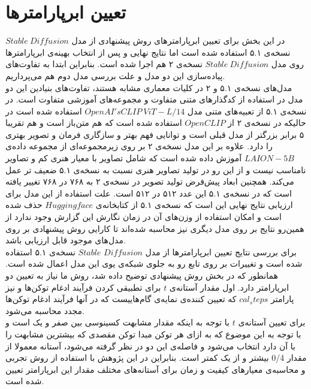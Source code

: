\section{تعیین ابرپارامترها}
در این بخش برای تعیین ابرپارامتر‌های روش پیشنهادی از مدل $Stable\ Diffusion$ نسخه‌ی ۵.۱ استفاده شده است اما نتایج نهایی و پس از انتخاب بهینه‌ی ابرپارامترها روی مدل $Stable\ Diffusion$ نسخه‌ی ۲ هم اجرا شده است. بنابراین ابتدا به تفاوت‌های پیاده‌سازی این دو مدل و علت بررسی مدل دوم هم می‌پرداریم.
\\
مدل‌های نسخه‌ی ۵.۱ و ۲ در کلیات معماری مشابه هستند، تفاوت‌های بنیادین این دو مدل در استفاده از کدگذارهای متنی متفاوت و مجموعه‌های آموزشی متفاوت است. در نسخه‌ی ۵.۱ از تعبیه‌های متنی مدل $OpenAI's CLIP\ ViT-L/14$ \cite{radford2021learning} استفاده شده است در حالیکه در نسخه‌ی ۲ از $OpenCLIP$ \cite{cherti2023reproducible}  استفاده شده است که هم متن‌باز است و هم تقریبا ۵ برابر بزرگتر از مدل قبلی است و توانایی فهم بهتر و سازگاری فرمان و تصویر بهتری را دارد. علاوه‌ بر این مدل نسخه‌ی ۲ بر روی زیرمجموعه‌ای از مجموعه داده‌ی $LAION-5B $ آموزش داده شده است که شامل تصاویر با معیار هنری کم و تصاویر نامناسب نیست و از این رو در تولید تصاویر هنری نسبت به نسخه‌ی ۵.۱ ضعیف تر عمل می‌کند. همچنین ابعاد پیش‌فرض تولید تصویر در نسخه‌ی ۲ به ۷۶۸ در ۷۶۸ تغییر یافته است که در نسخه‌ی ۵.۱ این عدد ۵۱۲ در ۵۱۲ است. علت استفاده از این مدل برای ارزیابی نتایج نهایی این است که نسخه‌ی ۵.۱ از کتابخانه‌ی $Hugging face$ حذف شده است و امکان استفاده از وزن‌های آن در زمان نگارش این گزارش وجود ندارد از همین‌رو نتایج بر روی مدل دیگری نیز محاسبه شده‌اند تا کارایی روش پیشنهادی بر روی مدل‌های موجود قابل ارزیابی باشد.
\\
برای بررسی نتایج تعیین ابرپارامتر‌ها از مدل $Diffusion$ $Stable$ نسخه‌ی ۵.۱ استفاده شده است و تغییرات بر روی تابع رو به جلوی شبکه‌ی یوی این مدل اعمال شده است. همانطور که در بخش روش پیشنهادی توضیح داده شد، روش ما نیاز به تعیین دو ابرپارامتر دارد. اول مقدار آستانه‌ی $t$  برای تطبیقی کردن فرآیند ادغام توکن‌ها و نیز پارامتر $cal_steps$ که تعیین کننده‌ی نمایه‌ی گام‌هاییست که در آنها فرآیند ادغام توکن‌ها مجدد محاسبه می‌شود.
\\
برای تعیین آستانه‌ی $t$ با توجه به اینکه مقدار مشابهت کسینوسی بین صفر و یک است و با توجه به این موضوع که به ازای هر توکن مبدا توکن مقصدی که بیشترین مشابهت را با آن دارد انتخاب می‌شود  و فاصله‌ی این دو در نظر گرفته می‌شود، آستانه معمولا از مقدار 0/4 بیشتر و از یک کمتر است. بنابراین در این پژوهش با استفاده از روش تجربی و محاسبه‌ی معیار‌های کیفیت و زمان برای آستانه‌های مختلف مقدار این ابرپارامتر تعیین شده است.
\\
